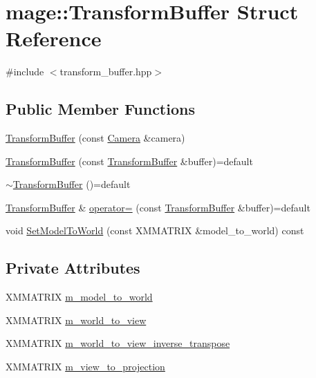 \hypertarget{structmage_1_1_transform_buffer}{}\section{mage\+:\+:Transform\+Buffer Struct Reference}
\label{structmage_1_1_transform_buffer}


{\ttfamily \#include $<$transform\+\_\+buffer.\+hpp$>$}

\subsection*{Public Member Functions}
\begin{DoxyCompactItemize}
\item 
\hyperlink{structmage_1_1_transform_buffer_a9a627fb63533073b2c699136e04dae14}{Transform\+Buffer} (const \hyperlink{classmage_1_1_camera}{Camera} \&camera)
\item 
\hyperlink{structmage_1_1_transform_buffer_a1ede694450450cc6b13a5caed373abad}{Transform\+Buffer} (const \hyperlink{structmage_1_1_transform_buffer}{Transform\+Buffer} \&buffer)=default
\item 
\hyperlink{structmage_1_1_transform_buffer_aac881d64eb39634d0e0e6cd8a13b6e2a}{$\sim$\+Transform\+Buffer} ()=default
\item 
\hyperlink{structmage_1_1_transform_buffer}{Transform\+Buffer} \& \hyperlink{structmage_1_1_transform_buffer_a5268ed4c7f416a54976f7ad18a1cb108}{operator=} (const \hyperlink{structmage_1_1_transform_buffer}{Transform\+Buffer} \&buffer)=default
\item 
void \hyperlink{structmage_1_1_transform_buffer_ab9d62cf4fc2332242333b4649779e706}{Set\+Model\+To\+World} (const X\+M\+M\+A\+T\+R\+IX \&model\+\_\+to\+\_\+world) const
\end{DoxyCompactItemize}
\subsection*{Private Attributes}
\begin{DoxyCompactItemize}
\item 
X\+M\+M\+A\+T\+R\+IX \hyperlink{structmage_1_1_transform_buffer_ac5f95a7f0e9ac61140c3520675da8e52}{m\+\_\+model\+\_\+to\+\_\+world}
\item 
X\+M\+M\+A\+T\+R\+IX \hyperlink{structmage_1_1_transform_buffer_af014f4da6aa86484c99c6b429af7da75}{m\+\_\+world\+\_\+to\+\_\+view}
\item 
X\+M\+M\+A\+T\+R\+IX \hyperlink{structmage_1_1_transform_buffer_a334cb416c43803c805bc7b57fe3a908e}{m\+\_\+world\+\_\+to\+\_\+view\+\_\+inverse\+\_\+transpose}
\item 
X\+M\+M\+A\+T\+R\+IX \hyperlink{structmage_1_1_transform_buffer_a4f077fa865fe8edf41619f5941ee605c}{m\+\_\+view\+\_\+to\+\_\+projection}
\end{DoxyCompactItemize}


